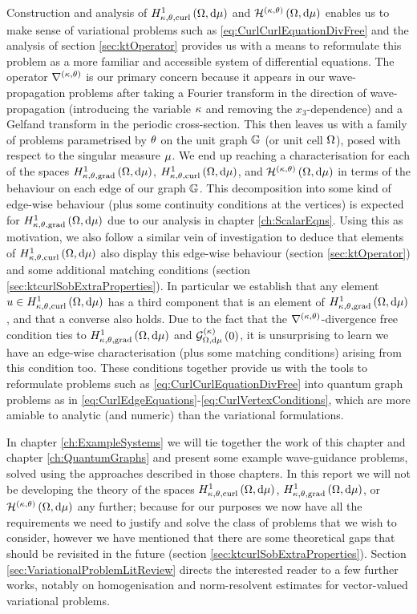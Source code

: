 Construction and analysis of $H^1_{\kappa,\theta,\mathrm{curl}}\left( \Omega, \mathrm{d}\mu \right)$ and $\mathcal{H}^{\left( \kappa, \theta \right)}\left( \Omega, \mathrm{d}\mu \right)$ enables us to make sense of variational problems such as \eqref{eq:CurlCurlEquationDivFree} and the analysis of section \ref{sec:ktOperator} provides us with a means to reformulate this problem as a more familiar and accessible system of differential equations.
The operator $\nabla^{\left( \kappa, \theta \right)}$ is our primary concern because it appears in our wave-propagation problems after taking a Fourier transform in the direction of wave-propagation (introducing the variable $\kappa$ and removing the $x_3$-dependence) and a Gelfand transform in the periodic cross-section.
This then leaves us with a family of problems parametrised by $\theta$ on the unit graph $\mathbb{G}$ (or unit cell $\Omega$), posed with respect to the singular measure $\mu$.
We end up reaching a characterisation for each of the spaces $H^1_{\kappa,\theta,\mathrm{grad}}\left( \Omega, \mathrm{d}\mu \right)$, $H^1_{\kappa,\theta,\mathrm{curl}}\left( \Omega, \mathrm{d}\mu \right)$, and $\mathcal{H}^{\left( \kappa, \theta \right)}\left( \Omega, \mathrm{d}\mu \right)$ in terms of the behaviour on each edge of our graph $\mathbb{G}$.
This decomposition into some kind of edge-wise behaviour (plus some continuity conditions at the vertices) is expected for $H^1_{\kappa,\theta,\mathrm{grad}}\left( \Omega, \mathrm{d}\mu \right)$ due to our analysis in chapter \ref{ch:ScalarEqns}.
Using this as motivation, we also follow a similar vein of investigation to deduce that elements of $H^1_{\kappa,\theta,\mathrm{curl}}\left( \Omega, \mathrm{d}\mu \right)$ also display this edge-wise behaviour (section \ref{sec:ktOperator}) and some additional matching conditions (section \ref{sec:ktcurlSobExtraProperties}).
In particular we establish that any element $u\in H^1_{\kappa,\theta,\mathrm{curl}}\left( \Omega, \mathrm{d}\mu \right)$ has a third component that is an element of $H^1_{\kappa,\theta,\mathrm{grad}}\left( \Omega, \mathrm{d}\mu \right)$, and that a converse also holds.
Due to the fact that the $\nabla^{\left( \kappa, \theta \right)}$-divergence free condition ties to $H^1_{\kappa,\theta,\mathrm{grad}}\left( \Omega, \mathrm{d}\mu \right)$ and $\mathcal{G}_{ \Omega, \mathrm{d}\mu}^{(\kappa)}\left( 0 \right)$, it is unsurprising to learn we have an edge-wise characterisation (plus some matching conditions) arising from this condition too.
These conditions together provide us with the tools to reformulate problems such as \eqref{eq:CurlCurlEquationDivFree} into quantum graph problems as in \eqref{eq:CurlEdgeEquations}-\eqref{eq:CurlVertexConditions}, which are more amiable to analytic (and numeric) than the variational formulations. \newline

In chapter \ref{ch:ExampleSystems} we will tie together the work of this chapter and chapter \ref{ch:QuantumGraphs} and present some example wave-guidance problems, solved using the approaches described in those chapters.
In this report we will not be developing the theory of the spaces $H^1_{\kappa,\theta,\mathrm{curl}}\left( \Omega, \mathrm{d}\mu \right)$, $H^1_{\kappa,\theta,\mathrm{grad}}\left( \Omega, \mathrm{d}\mu \right)$, or $\mathcal{H}^{\left( \kappa, \theta \right)}\left( \Omega, \mathrm{d}\mu \right)$ any further; because for our purposes we now have all the requirements we need to justify and solve the class of problems that we wish to consider, however we have mentioned that there are some theoretical gaps that should be revisited in the future (section \ref{sec:ktcurlSobExtraProperties}).
Section \ref{sec:VariationalProblemLitReview} directs the interested reader to a few further works, notably on homogenisation and norm-resolvent estimates for vector-valued variational problems.